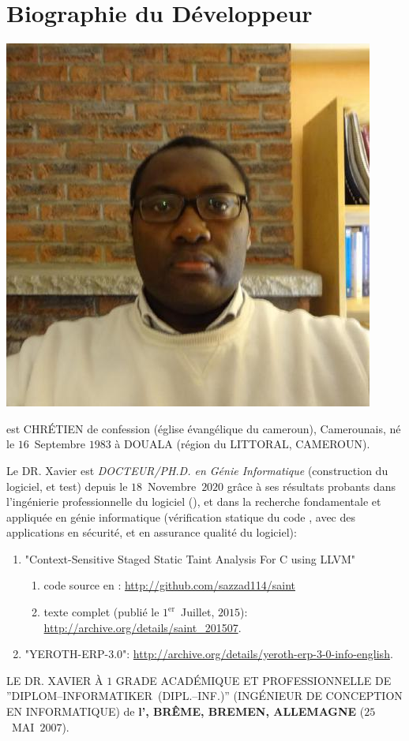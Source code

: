 \section{Biographie du D\'eveloppeur}\label{chap:biographie}
\vspace{-0.9em}

\begin{center}
\includegraphics[scale=0.32]{../../francais/images/XavierNOUNDOU-2}
\end{center}

\textbf{\myfullacademicname} est CHR\'ETIEN de confession
(\'eglise \'evang\'elique du cameroun),
Camerounais, n\'e le $16$~Septembre $1983$ \`a
DOUALA (r\'egion du LITTORAL, CAMEROUN).

Le DR. Xavier est \textit{DOCTEUR/PH.D. en G\'enie Informatique}
(construction du logiciel, et test) depuis le $18$~Novembre~$2020$
gr\^ace \`a ses r\'esultats probants dans l'ing\'enierie
professionnelle du logiciel (\yerotherpblack), et dans la recherche
fondamentale et appliqu\'ee en g\'enie informatique
(v\'erification statique du code \cplusplus, avec des applications
en s\'ecurit\'e, et en assurance qualit\'e du logiciel):

\begin{enumerate}
	\item "Context-Sensitive Staged Static Taint Analysis
			For C using LLVM"
		\begin{enumerate}[1.]
			\itemsep -0.7em
			\item code source en \cplusplus: \url{http://github.com/sazzad114/saint}
			\item texte complet (publi\'e le $1^\text{er}$~Juillet, $2015$): \url{http://archive.org/details/saint_201507}.
		\end{enumerate}		 

	\item "YEROTH-ERP-3.0": \url{http://archive.org/details/yeroth-erp-3-0-info-english}.\\
\end{enumerate}


LE DR. XAVIER \`A $1$ GRADE ACAD\'EMIQUE ET PROFESSIONNELLE
DE ''DIPLOM--INFORMATIKER~(DIPL.--INF.)''
(ING\'ENIEUR DE CONCEPTION EN INFORMATIQUE) de
\textbf{l'\bremenu, BR\^EME, BREMEN, ALLEMAGNE}
($25$~MAI~$2007$).

